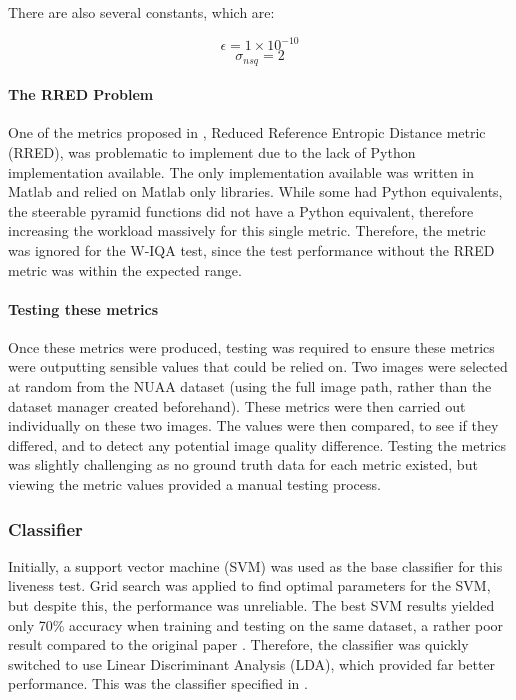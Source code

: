 \documentclass[10pt,a4paper]{article}
\begin{document}
                There are also several constants, which are:


                $$\epsilon = 1 \times 10^{-10}$$
                $$\sigma_{nsq} = 2$$

            \paragraph{The RRED Problem}
            One of the metrics proposed in \cite{ImageQualityAssessmentTest}, Reduced Reference Entropic Distance metric (RRED), was problematic to implement due to the lack of Python implementation available.
            The only implementation available was written in Matlab and relied on Matlab only libraries. While some had Python equivalents, the steerable pyramid functions did not have a Python equivalent, therefore increasing the workload massively for this single metric. Therefore, the metric was ignored for the W-IQA
            test, since the test performance without the RRED metric was within the expected range. 
            
            \paragraph{Testing these metrics}
            Once these metrics were produced, testing was required to ensure these metrics were outputting sensible values that could be relied on.
            Two images were selected at random from the NUAA dataset (using the full image path, rather than the dataset manager created beforehand). These metrics were then carried out individually on these two images. The values were then compared, to see if they differed, and to detect any potential image quality difference. 
            Testing the metrics was slightly challenging as no ground truth data for each metric existed, but viewing the metric values provided a manual testing process.


        \subsubsection{Classifier}
            Initially, a support vector machine (SVM) was used as the base classifier for this liveness test. Grid search was applied to find optimal parameters for the SVM, but despite this, the performance was unreliable. The best SVM results yielded only 70\% accuracy when training and testing on the same dataset, a rather poor result compared to the original paper \cite{ImageQualityAssessmentTest}. Therefore, the classifier was quickly switched to use Linear Discriminant Analysis (LDA), which provided far better performance. This was the classifier specified in \cite{ImageQualityAssessmentTest}.
\end{document}
